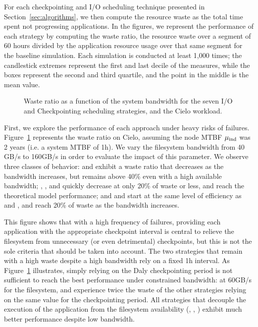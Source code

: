For each checkpointing and I/O scheduling technique presented in
Section~\ref{sec:algorithms}, we then compute the resource waste as
the total time spent not progressing applications. In the figures, we
represent the performance of each strategy by computing the waste
ratio, \ie the resource waste over a segment of 60 hours divided by
the application resource usage over that same segment for the baseline
simulation. Each simulation is conducted at least 1,000 times; the
candlestick extremes represent the first and last decile of the
measures, while the boxes represent the second and third quartile, and
the point in the middle is the mean value.

\begin{figure}
  \begin{center}
    \resizebox{\linewidth}{!}{}
  \end{center}
  \caption{Waste ratio as a function of the system bandwidth for the
    seven I/O and Checkpointing scheduling strategies, and the Cielo
    workload. \label{fig:cielo-1hmtbf}}
\end{figure}

First, we explore the performance of each approach under heavy risks
of failures. Figure~\ref{fig:cielo-1hmtbf} represents the waste ratio
on Cielo, assuming the node MTBF $\mu_{\text{ind}}$ was 2 years (i.e. a system MTBF of
1h). We vary the filesystem bandwidth from 40 GB/s to 160GB/s in order
to evaluate the impact of this parameter. We observe three classes of
behavior: \propfixed and \bfifofixed exhibit a waste ratio that
decreases as the bandwidth increases, but remains above 40\% even with
a high available bandwidth; \fifodaly, \fifofixed, and \cooperative
quickly decrease at only 20\% of waste or less, and reach the
theoretical model performance; and \propdaly and \bfifodaly start at
the same level of efficiency as \propfixed and \bfifofixed, and reach
20\% of waste as the bandwidth increases.

This figure shows that with a high frequency of failures, providing
each application with the appropriate checkpoint interval is central
to relieve the filesystem from unnecessary (or even detrimental)
checkpoints, but this is not the sole criteria that should be taken
into account. The two strategies that remain with a high waste despite
a high bandwidth rely on a fixed 1h interval. As Figure~\ref{fig:cielo-1hmtbf}
illustrates, simply relying on the Daly checkpointing period is not
sufficient to reach the best performance under constrained bandwidth:
at 60GB/s for the filesystem, \propdaly and \bfifodaly experience
twice the waste of the other strategies relying on the same value for
the checkpointing period. All strategies that decouple the execution
of the application from the filesystem availability (\fifodaly,
\fifofixed, \cooperative) exhibit much better performance despite low
bandwidth.

